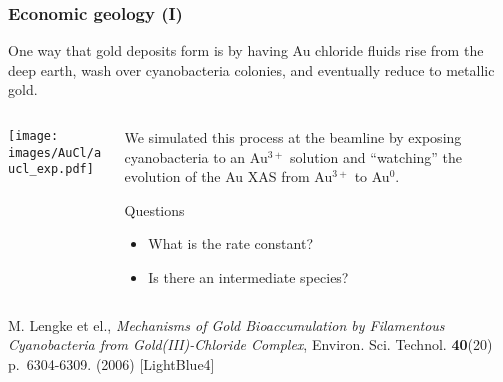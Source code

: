 \documentclass[10pt, xcolor=x11names, compress]{beamer}
\begin{document}
\begin{frame}
  \frametitle{Economic geology (I)}

  One way that gold deposits form is by having Au chloride fluids rise
  from the deep earth, wash over cyanobacteria colonies, and
  eventually reduce to metallic gold.

  \begin{columns}
    \begin{column}{0.5\linewidth}
      \texttt{[image: images/AuCl/aucl\_exp.pdf]}
    \end{column}
    \begin{column}{0.5\linewidth}
      We simulated this process at the beamline by exposing
      cyanobacteria to an Au$^{3+}$ solution and ``watching'' the
      evolution of the Au XAS from Au$^{3+}$ to Au$^0$.

      \begin{block}{Questions}
        \begin{itemize}
        \item What is the rate constant?
        \item Is there an intermediate species?
        \end{itemize}
      \end{block}
    \end{column}
  \end{columns}

  \begin{bottomnote}[0.5][19]
    M. Lengke et el., \textit{Mechanisms of Gold Bioaccumulation by
      Filamentous Cyanobacteria from Gold(III)-Chloride Complex},
    Environ. Sci. Technol. \textbf{40}(20) p.~6304-6309. (2006)
    [LightBlue4]
  \end{bottomnote}
\end{frame}
\end{document}
